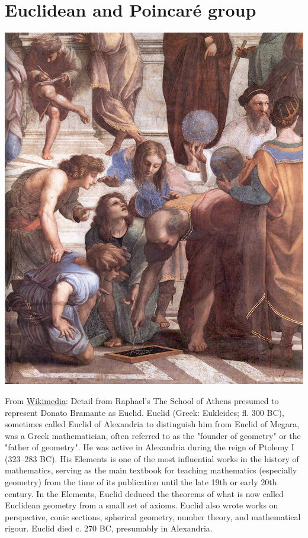 \documentclass[../main.tex]{subfiles}
\begin{document}
\section{Euclidean and Poincaré group}
\begin{marginfigure}
	\includegraphics[width=1\linewidth]{images/Sanzio_01_Euclid.jpg}
	\caption[Detail from Raphael's The School of Athens presumed to represent Donato Bramante as Euclid.]{From \href{https://commons.wikimedia.org/wiki/File:Sanzio_01_Euclid.jpg}{Wikimedia}: Detail from Raphael's The School of Athens presumed to represent Donato Bramante as Euclid. Euclid (Greek: Eukleides; fl. 300 BC), sometimes called Euclid of Alexandria to distinguish him from Euclid of Megara, was a Greek mathematician, often referred to as the "founder of geometry" or the "father of geometry". He was active in Alexandria during the reign of Ptolemy I (323–283 BC). His Elements is one of the most influential works in the history of mathematics, serving as the main textbook for teaching mathematics (especially geometry) from the time of its publication until the late 19th or early 20th century. In the Elements, Euclid deduced the theorems of what is now called Euclidean geometry from a small set of axioms. Euclid also wrote works on perspective, conic sections, spherical geometry, number theory, and mathematical rigour. Euclid died c. 270 BC, presumably in Alexandria.}
\end{marginfigure}
\end{document}
